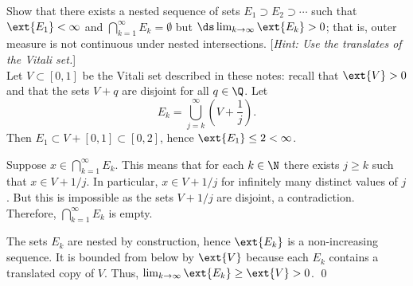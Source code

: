 \begin{hwsol}
Show that there exists a nested sequence of sets $E_1 \supset E_2 \supset \cdots$ such that 
$\ext{E_1}< \infty$ and $\bigcap_{k=1}^\infty E_k= \emptyset$ but $\ds\lim_{k \to \infty } \ext{E_k}> 0$; that is, outer measure is not continuous under nested intersections. [\emph{Hint: Use the translates of the Vitali set.}] \\

\pf Let $V \subset [0, 1]$ be the Vitali set described in these notes: recall that  $\ext{V}>0$ and that the sets $V+q$ are disjoint for all $q \in \Q$. Let 
        \[
        E_k= \bigcup_{j=k}^\infty \left( V + \dfrac{1}{j} \right).
        \]
Then $E_1 \subset V + [0, 1] \subset [0, 2]$, hence $\ext{E_1} \leq 2 < \infty$. 

Suppose $x \in \bigcap_{k=1}^\infty E_k$. This means that for each $k \in \N$ there exists $j \geq k$ such that $x \in V+1/j$. In particular, $x \in V+1/j$ for infinitely many distinct values of $j$. But this is impossible as the sets $V+1/j$ are disjoint, a contradiction. Therefore, $\bigcap_{k=1}^\infty E_k$ is empty.

The sets $E_k$ are nested by construction, hence $\ext{E_k}$ is a non-increasing sequence. It is bounded from below by $\ext{V}$ because each $E_k$ contains a translated copy of $V$. Thus, $\lim_{k \to \infty} \ext{E_k} \geq \ext{V}> 0$. \qed \\
\end{hwsol}


